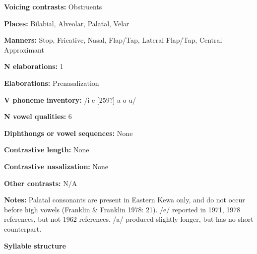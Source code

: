\begin{styleBody}
\textbf{Voicing contrasts:} Obstruents
\end{styleBody}

\begin{styleBody}
\textbf{Places:} Bilabial, Alveolar, Palatal, Velar
\end{styleBody}

\begin{styleBody}
\textbf{Manners:} Stop, Fricative, Nasal, Flap/Tap, Lateral Flap/Tap, Central Approximant
\end{styleBody}

\begin{styleBody}
\textbf{N elaborations:} 1
\end{styleBody}

\begin{styleBody}
\textbf{Elaborations:} Prenasalization
\end{styleBody}

\begin{styleBody}
\textbf{V phoneme inventory:} /i e [259?] a o u/
\end{styleBody}

\begin{styleBody}
\textbf{N vowel qualities:} 6
\end{styleBody}

\begin{styleBody}
\textbf{Diphthongs or vowel sequences:} None
\end{styleBody}

\begin{styleBody}
\textbf{Contrastive length:} None
\end{styleBody}

\begin{styleBody}
\textbf{Contrastive nasalization:} None
\end{styleBody}

\begin{styleBody}
\textbf{Other contrasts:} N/A
\end{styleBody}

\begin{styleBody}
\textbf{Notes:} Palatal consonants are present in Eastern Kewa only, and do not occur before high vowels (Franklin \& Franklin 1978: 21). /e/ reported in 1971, 1978 references, but not 1962 references. /a/ produced slightly longer, but has no short counterpart.
\end{styleBody}

\begin{styleBody}
\textbf{Syllable structure}
\end{styleBody}

